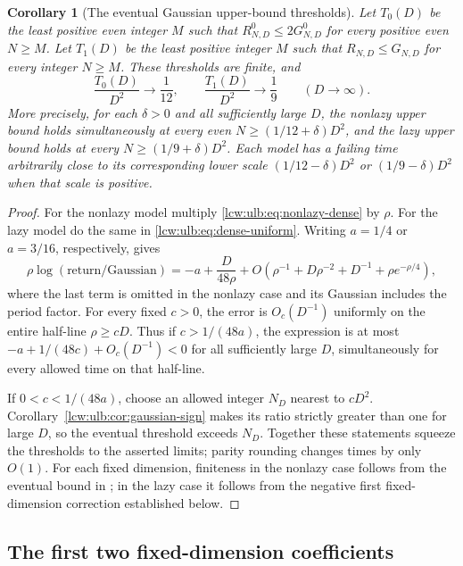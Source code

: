 \documentclass[11pt,letterpaper]{article}
\newtheorem{corollary}[theorem]{Corollary}
\theoremstyle{remark}\newtheorem{remark}[theorem]{Remark}
\begin{document}
\begin{corollary}[The eventual Gaussian upper-bound thresholds]
\label{lcw:ulb:cor:eventual-threshold}
Let $T_0(D)$ be the least positive even integer $M$ such that
$R^0_{N,D}\le2G^0_{N,D}$ for every positive even $N\ge M$.
Let $T_1(D)$ be the least positive integer $M$ such that
$R_{N,D}\le G_{N,D}$ for every integer $N\ge M$.
These thresholds are finite, and
\[
 \frac{T_0(D)}{D^2}\longrightarrow\frac1{12},\qquad
 \frac{T_1(D)}{D^2}\longrightarrow\frac1{9}
 \qquad(D\to\infty).
\]
More precisely, for each $\delta>0$ and all sufficiently large $D$,
the nonlazy upper bound holds simultaneously at every even
$N\ge(1/12+\delta)D^2$, and the lazy upper bound holds at every
$N\ge(1/9+\delta)D^2$. Each model has a failing time arbitrarily
close to its corresponding lower scale $(1/12-\delta)D^2$ or
$(1/9-\delta)D^2$ when that scale is positive.
\end{corollary}
\begin{proof}
For the nonlazy model multiply \eqref{lcw:ulb:eq:nonlazy-dense} by $\rho$.
For the lazy model do the same in \eqref{lcw:ulb:eq:dense-uniform}.
Writing $a=1/4$ or $a=3/16$, respectively, gives
\[
 \rho\log(\text{return}/\text{Gaussian})
 =-a+\frac{D}{48\rho}
  +O\left(\rho^{-1}+D\rho^{-2}+D^{-1}
              +\rho e^{-\rho/4}\right),
\]
where the last term is omitted in the nonlazy case and its Gaussian
includes the period factor. For every fixed $c>0$, the error is
$O_c(D^{-1})$ uniformly on the entire half-line $\rho\ge cD$.
Thus if $c>1/(48a)$, the expression is at most
$-a+1/(48c)+O_c(D^{-1})<0$ for all sufficiently large $D$,
simultaneously for every allowed time on that half-line.

If $0<c<1/(48a)$, choose an allowed integer $N_D$ nearest to $cD^2$.
Corollary~\ref{lcw:ulb:cor:gaussian-sign} makes its ratio strictly greater
than one for large $D$, so the eventual threshold exceeds $N_D$.
Together these statements squeeze the thresholds to the asserted
limits; parity rounding changes times by only $O(1)$.
For each fixed dimension, finiteness in the nonlazy case follows from
the eventual bound in \cite{ballsterbenz}; in the lazy case it follows
from the negative first fixed-dimension correction established below.
\end{proof}

\subsection{The first two fixed-dimension coefficients}
\label{lcw:ulb:subsec:dense-cumulant-check}
\end{document}
